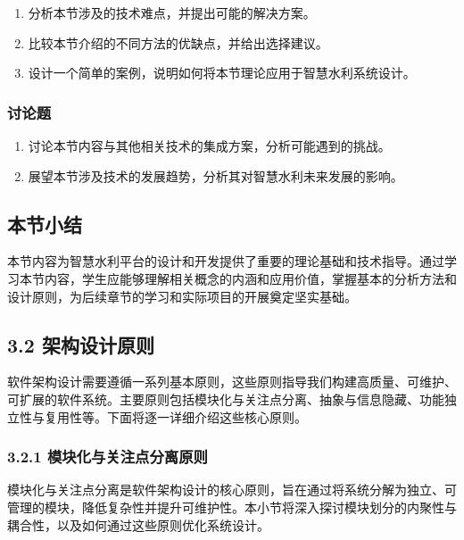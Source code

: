 \begin{enumerate}
\def\labelenumi{\arabic{enumi}.}
\setcounter{enumi}{3}
\tightlist
\item
  分析本节涉及的技术难点，并提出可能的解决方案。
\item
  比较本节介绍的不同方法的优缺点，并给出选择建议。
\item
  设计一个简单的案例，说明如何将本节理论应用于智慧水利系统设计。
\end{enumerate}

\subsubsection{讨论题}\label{ux8ba8ux8bbaux9898}

\begin{enumerate}
\def\labelenumi{\arabic{enumi}.}
\setcounter{enumi}{6}
\tightlist
\item
  讨论本节内容与其他相关技术的集成方案，分析可能遇到的挑战。
\item
  展望本节涉及技术的发展趋势，分析其对智慧水利未来发展的影响。
\end{enumerate}

\subsection{本节小结}\label{ux672cux8282ux5c0fux7ed3}

本节内容为智慧水利平台的设计和开发提供了重要的理论基础和技术指导。通过学习本节内容，学生应能够理解相关概念的内涵和应用价值，掌握基本的分析方法和设计原则，为后续章节的学习和实际项目的开展奠定坚实基础。

\subsection{3.2 架构设计原则}\label{ux67b6ux6784ux8bbeux8ba1ux539fux5219}

软件架构设计需要遵循一系列基本原则，这些原则指导我们构建高质量、可维护、可扩展的软件系统。主要原则包括模块化与关注点分离、抽象与信息隐藏、功能独立性与复用性等。下面将逐一详细介绍这些核心原则。

\subsubsection{3.2.1 模块化与关注点分离原则}\label{ux6a21ux5757ux5316ux4e0eux5173ux6ce8ux70b9ux5206ux79bbux539fux5219}

模块化与关注点分离是软件架构设计的核心原则，旨在通过将系统分解为独立、可管理的模块，降低复杂性并提升可维护性。本小节将深入探讨模块划分的内聚性与耦合性，以及如何通过这些原则优化系统设计。

